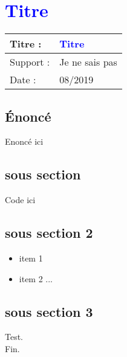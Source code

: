 \lstset{language=c}
\renewcommand{\titre}{\textcolor{blue}{ Titre }}

\lhead{ \titre }
\section{{\titre} }

\begin{tabular}{|l|l|}
\hline
Titre : 	& \titre \\\hline
Support : 	& Je ne sais pas\\\hline
Date :		& 08/2019 \\\hline
\end{tabular}

\subsection{Énoncé}

Enoncé ici

\subsection{sous section}

Code ici 



\subsection{sous section 2}

\begin{itemize}
\item item 1
\item item 2 ...
\end{itemize}

\subsection{sous section 3}

Test.\\
Fin.
\newpage
